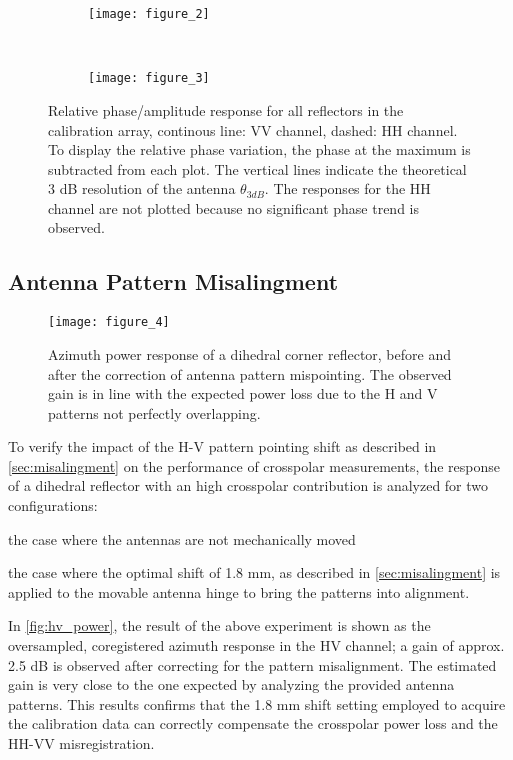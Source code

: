 \begin{figure*}[ht]
	\centering
	\begin{subfigure}[t]{\textwidth}
		\centering
		\texttt{[image: figure\_2]}
		\label{fig:phase_response_VV:uncorrected}
	\end{subfigure}\\
	\begin{subfigure}[t]{\textwidth}
		\centering
		\texttt{[image: figure\_3]}
		\label{fig:phase_response_VV:corrected}
	\end{subfigure}
	\caption{Relative phase/amplitude response for all reflectors in the calibration array, continous line: VV channel, dashed: HH channel. To display the relative phase variation, the phase at the maximum is subtracted from each plot. The vertical lines indicate the theoretical 3 dB resolution of the antenna $\theta_{3dB}$. The responses for the HH channel are not plotted because no significant phase trend is observed.}
	\label{fig:phase_response_VV}
\end{figure*}

\subsection{Antenna Pattern Misalingment}
\begin{figure*}[ht!]
	\centering
	\texttt{[image: figure\_4]}
	\caption{Azimuth power response of a dihedral corner reflector, before and after the correction of antenna pattern mispointing. The observed gain is in line with the expected power loss due to the H and V patterns not perfectly overlapping.}
	\label{fig:hv_power}
\end{figure*}
To verify the impact of the H-V pattern pointing shift as described in \autoref{sec:misalingment} on the performance of crosspolar measurements, the response of a dihedral reflector with an high crosspolar contribution is analyzed for two configurations:\\ \begin{enumerate*}\item the case where the antennas are not mechanically moved \item the case where the optimal shift of 1.8 mm, as described in \autoref{sec:misalingment} is applied to the movable antenna hinge to bring the patterns into alignment.\\ 
\end{enumerate*}
In \autoref{fig:hv_power}, the result of the above experiment is shown as the oversampled, coregistered azimuth response in the HV channel; a gain of approx. 2.5 dB is observed after correcting for the pattern misalignment. The estimated gain is very close to the one expected by analyzing the provided antenna patterns. This results confirms that the 1.8 mm shift setting employed to acquire the calibration data can correctly compensate the crosspolar power loss and the HH-VV misregistration.

